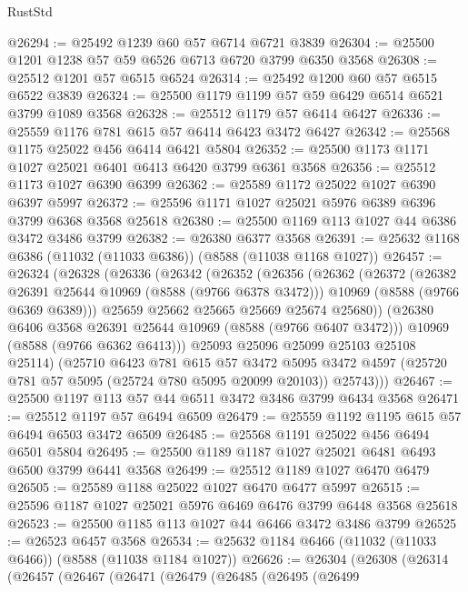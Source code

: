 \begin{lexlean}{RustStd}
\begin{coremodule}
@26294 := @25492 @1239 @60 @57 @6714 @6721 @3839
@26304 := @25500 @1201 @1238 @57 @59 @6526 @6713 @6720 @3799 @6350 @3568
@26308 := @25512 @1201 @57 @6515 @6524
@26314 := @25492 @1200 @60 @57 @6515 @6522 @3839
@26324 := @25500 @1179 @1199 @57 @59 @6429 @6514 @6521 @3799 @1089 @3568
@26328 := @25512 @1179 @57 @6414 @6427
@26336 := @25559 @1176 @781 @615 @57 @6414 @6423 @3472 @6427
@26342 := @25568 @1175 @25022 @456 @6414 @6421 @5804
@26352 := @25500 @1173 @1171 @1027 @25021 @6401 @6413 @6420 @3799 @6361 @3568
@26356 := @25512 @1173 @1027 @6390 @6399
@26362 := @25589 @1172 @25022 @1027 @6390 @6397 @5997
@26372 := @25596 @1171 @1027 @25021 @5976 @6389 @6396 @3799 @6368 @3568 @25618
@26380 := @25500 @1169 @113 @1027 @44 @6386 @3472 @3486 @3799
@26382 := @26380 @6377 @3568
@26391 := @25632 @1168 @6386 (@11032 (@11033 @6386)) (@8588 (@11038 @1168 @1027))
@26457 := @26324
    (@26328
      (@26336
        (@26342
          (@26352
            (@26356
              (@26362
                (@26372
                  (@26382 @26391 @25644 @10969 (@8588 (@9766 @6378 @3472)))
                  @10969
                  (@8588 (@9766 @6369 @6389)))
                @25659
                @25662
                @25665
                @25669
                @25674
                @25680))
            (@26380 @6406 @3568 @26391 @25644 @10969 (@8588 (@9766 @6407 @3472)))
            @10969
            (@8588 (@9766 @6362 @6413)))
          @25093
          @25096
          @25099
          @25103
          @25108
          @25114)
        (@25710
          @6423
          @781
          @615
          @57
          @3472
          @5095
          @3472
          @4597
          (@25720 @781 @57 @5095 (@25724 @780 @5095 @20099 @20103))
          @25743)))
@26467 := @25500 @1197 @113 @57 @44 @6511 @3472 @3486 @3799 @6434 @3568
@26471 := @25512 @1197 @57 @6494 @6509
@26479 := @25559 @1192 @1195 @615 @57 @6494 @6503 @3472 @6509
@26485 := @25568 @1191 @25022 @456 @6494 @6501 @5804
@26495 := @25500 @1189 @1187 @1027 @25021 @6481 @6493 @6500 @3799 @6441 @3568
@26499 := @25512 @1189 @1027 @6470 @6479
@26505 := @25589 @1188 @25022 @1027 @6470 @6477 @5997
@26515 := @25596 @1187 @1027 @25021 @5976 @6469 @6476 @3799 @6448 @3568 @25618
@26523 := @25500 @1185 @113 @1027 @44 @6466 @3472 @3486 @3799
@26525 := @26523 @6457 @3568
@26534 := @25632 @1184 @6466 (@11032 (@11033 @6466)) (@8588 (@11038 @1184 @1027))
@26626 := @26304
    (@26308
      (@26314
        (@26457
          (@26467
            (@26471
              (@26479
                (@26485
                  (@26495
                    (@26499

\end{coremodule}
\end{lexlean}
